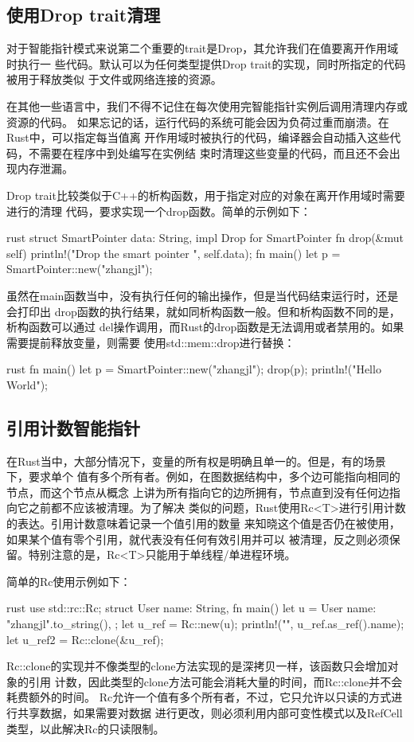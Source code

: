 \subsection{使用Drop trait清理}
对于智能指针模式来说第二个重要的trait是Drop，其允许我们在值要离开作用域时执行一
些代码。默认可以为任何类型提供Drop trait的实现，同时所指定的代码被用于释放类似
于文件或网络连接的资源。

在其他一些语言中，我们不得不记住在每次使用完智能指针实例后调用清理内存或资源的代码。
如果忘记的话，运行代码的系统可能会因为负荷过重而崩溃。在Rust中，可以指定每当值离
开作用域时被执行的代码，编译器会自动插入这些代码，不需要在程序中到处编写在实例结
束时清理这些变量的代码，而且还不会出现内存泄漏。

Drop trait比较类似于C++的析构函数，用于指定对应的对象在离开作用域时需要进行的清理
代码，要求实现一个drop函数。简单的示例如下：
\begin{code-block}{rust}
struct SmartPointer {
    data: String,
}
impl Drop for SmartPointer {
    fn drop(&mut self) {
        println!("Drop the smart pointer {}", self.data);
    }
}
fn main() {
    let p = SmartPointer::new("zhangjl");
}
\end{code-block}
虽然在main函数当中，没有执行任何的输出操作，但是当代码结束运行时，还是会打印出
drop函数的执行结果，就如同析构函数一般。但和析构函数不同的是，析构函数可以通过
del操作调用，而Rust的drop函数是无法调用或者禁用的。如果需要提前释放变量，则需要
使用std::mem::drop进行替换：
\begin{code-block}{rust}
fn main() {
    let p = SmartPointer::new("zhangjl");
    drop(p);
    println!("Hello World");
}
\end{code-block}

\subsection{引用计数智能指针}
在Rust当中，大部分情况下，变量的所有权是明确且单一的。但是，有的场景下，要求单个
值有多个所有者。例如，在图数据结构中，多个边可能指向相同的节点，而这个节点从概念
上讲为所有指向它的边所拥有，节点直到没有任何边指向它之前都不应该被清理。为了解决
类似的问题，Rust使用Rc<T>进行引用计数的表达。引用计数意味着记录一个值引用的数量
来知晓这个值是否仍在被使用，如果某个值有零个引用，就代表没有任何有效引用并可以
被清理，反之则必须保留。特别注意的是，Rc<T>只能用于单线程/单进程环境。

简单的Rc使用示例如下：
\begin{code-block}{rust}
use std::rc::Rc;
struct User {
    name: String,
}
fn main() {
    let u = User {
        name: "zhangjl".to_string(),
    };
    let u_ref = Rc::new(u);
    println!("{}", u_ref.as_ref().name);
    let u_ref2 = Rc::clone(&u_ref);
}
\end{code-block}
Rc::clone的实现并不像类型的clone方法实现的是深拷贝一样，该函数只会增加对象的引用
计数，因此类型的clone方法可能会消耗大量的时间，而Rc::clone并不会耗费额外的时间。
Rc允许一个值有多个所有者，不过，它只允许以只读的方式进行共享数据，如果需要对数据
进行更改，则必须利用内部可变性模式以及RefCell类型，以此解决Rc的只读限制。


